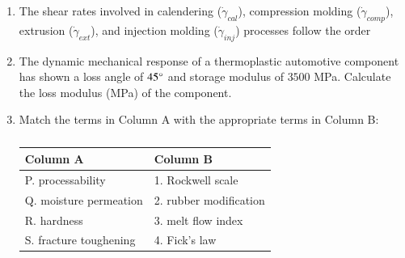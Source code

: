 \documentclass[a4paper,10pt]{article}
\begin{document}
\begin{enumerate}
    \item The shear rates involved in calendering ($\dot{\gamma}_{cal}$), compression molding ($\dot{\gamma}_{comp}$), extrusion ($\dot{\gamma}_{ext}$), and injection molding ($\dot{\gamma}_{inj}$) processes follow the order
    
    \hfill{}
    \begin{enumerate}
    \end{enumerate}

    \item The dynamic mechanical response of a thermoplastic automotive component has shown a loss angle of $45\degree$ and storage modulus of $3500$ MPa. Calculate the loss modulus (MPa) of the component.
    
    \hfill{}
    
    \item Match the terms in Column A with the appropriate terms in Column B:
    \begin{table}[h!] \centering \caption*{} \label{tab:q17_polymer}
        \begin{tabular}{ll} \hline
            \textbf{Column A} & \textbf{Column B} \\ \hline
            P. processability & 1. Rockwell scale \\
            Q. moisture permeation & 2. rubber modification \\
            R. hardness & 3. melt flow index \\
            S. fracture toughening & 4. Fick's law \\ \hline
        \end{tabular}
    \end{table}
    
    \hfill{}
    \begin{enumerate}
    \end{enumerate}


\end{enumerate}
\end{document}
